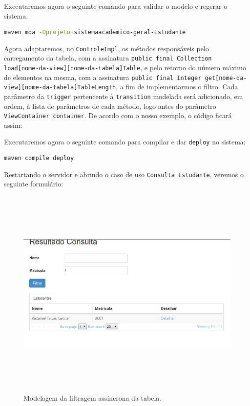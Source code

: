 Executaremos agora o seguinte comando para validar o modelo e regerar o
sistema:
\begin{lstlisting}[language=bash, frame=single, breaklines=true]
maven mda -Dprojeto=sistemaacademico-geral-Estudante
\end{lstlisting}

Agora adaptaremos, no \texttt{ControleImpl}, os métodos responsáveis pelo
carregamento da tabela, com a assinatura \texttt{public final Collection
load[nome-da-view][nome-da-tabela]Table}, e pelo retorno do número máximo de
elementos na mesma, com a assinatura \texttt{public final Integer
get[nome-da-view][nome-da-tabela]TableLength}, a fim de implementarmos o filtro.
Cada parâmetro da \texttt{trigger} pertencente à \texttt{transition} modelada
será adicionado, em ordem, à lista de parâmetros de cada método, logo antes do
parâmetro \texttt{ViewContainer container}. De acordo com o nosso exemplo, o
código ficará assim:


Executaremos agora o seguinte comando para compilar e dar \texttt{deploy} no
sistema:
\begin{lstlisting}[language=bash, frame=single, breaklines=true]
maven compile deploy
\end{lstlisting}

Restartando o servidor e abrindo o caso de uso \texttt{Consulta Estudante},
veremos o seguinte formulário:
\begin{figure}[H]
	\centering
	\includegraphics[width=340pt,height=300pt]{files/imgs/tutorial-mdarte-0042.png}
	\caption{Modelagem da filtragem assíncrona da tabela.}
	\label{modelando_filtragem_assincrona}
\end{figure}
